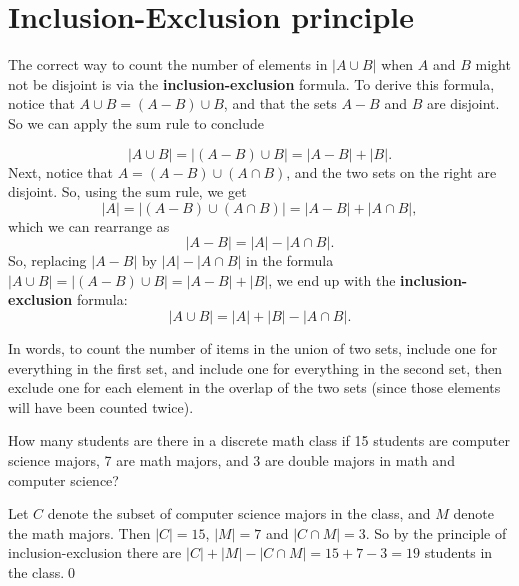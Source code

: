 \section{Inclusion-Exclusion principle}
The correct way to count the number of elements in
$|A\cup B|$ when $A$ and $B$ might not be disjoint is via the {\bfseries  inclusion-exclusion}
formula. To derive this formula, notice that $A\cup B = (A-B)\cup B$,
 and that the
sets $A-B$ and $B$ are disjoint. So we can apply the sum rule to conclude
\begin{marginfigure} %
\caption{ $A \cup B = \left(A - B\right) \cup B$}
\end{marginfigure}
\[
\lvert A\cup B \rvert = \lvert (A-B)\cup B \rvert =  \lvert A-B \rvert +  \lvert B \rvert.
\]
Next, notice that $A = (A-B) \cup (A\cap B)$, and the two sets on the right are disjoint.
So, using the sum rule, we get 
\[
\lvert A \rvert = \lvert (A-B)\cup(A\cap B) \rvert =  \lvert A-B \rvert + \lvert A\cap B \rvert,
\]
which we can rearrange as 
\[
\lvert A-B \rvert = \lvert A \rvert -  \lvert A\cap B \rvert.
\]
So, replacing $\lvert A-B \rvert$ by $\lvert A \rvert - \lvert A\cap B \rvert$ 
in the formula $\lvert A\cup B \rvert = \lvert (A-B)\cup B \rvert = \lvert A-B \rvert + \lvert B \rvert$,
we end up with the {\bfseries  inclusion-exclusion} formula:
\[
\lvert A\cup B \rvert = \lvert A \rvert +\lvert B \rvert-\lvert A\cap B \rvert.
\]

In words, to count the number of items in the union of two sets, include one for everything in the 
first set, and include one for everything in the second set, then exclude one for each element in the
overlap of the two sets (since those elements will have been counted twice).

\begin{exmp}
How many students are there in a discrete math class if 
15 students are computer science majors, 7 are math majors, and 3 are double majors
in math and computer science?
\end{exmp}
\begin{soln}
Let $C$ denote the subset of computer science majors in the class, and
$M$ denote the math majors. Then $\lvert C\rvert=15$, $\lvert M\rvert=7$ 
and $\lvert C\cap M\rvert=3$. So by
the principle of inclusion-exclusion there are 
$\lvert C\rvert+\lvert M\rvert-\lvert C\cap M\rvert=15+7-3=19$ students in the class.\;\qed
\end{soln}


